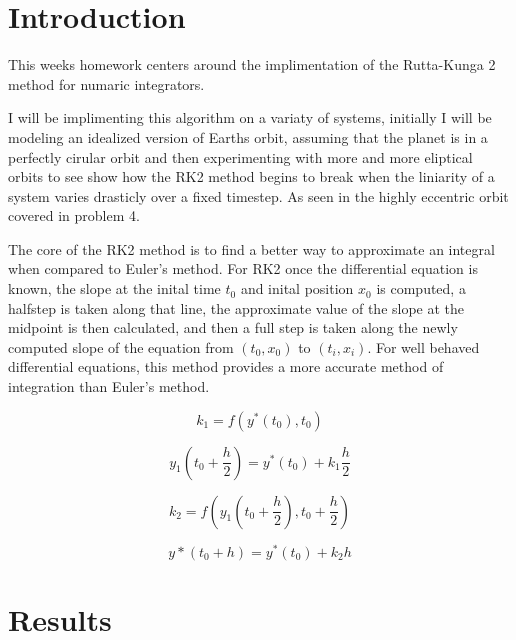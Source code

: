 \documentclass{article}
\author{\hwauthor}
\title{\hwtitle}
\date{\hwdate}
\begin{document}
\maketitle
\thispagestyle{fancy}

\section{Introduction}
 
This weeks homework centers around the implimentation of the Rutta-Kunga 2 method for numaric integrators.

I will be implimenting this algorithm on a variaty of systems, initially I will be modeling an idealized version of Earths orbit, assuming that the planet is in a perfectly cirular orbit and then experimenting with more and more eliptical orbits to see show how the RK2 method begins to break when the liniarity of a system varies drasticly over a fixed timestep. As seen in the highly eccentric orbit covered in problem 4. 

The core of the RK2 method is to find a better way to approximate an integral when compared to Euler's method. For RK2 once the differential equation is known, the slope at the inital time $t_0$ and inital position $x_0$ is computed, a halfstep is taken along that line, the approximate value of the slope at the midpoint is then calculated, and then a full step is taken along the newly computed slope of the equation from $(t_0, x_0)$ to $(t_i, x_i)$. For well behaved differential equations, this method provides a more accurate method of integration than Euler's method.

\begin{equation}
	k_1 = f(y^*(t_0),t_0)
\end{equation}

\begin{equation}
	y_1(t_0 + \frac{h}{2}) = y^*(t_0) + k_1\frac{h}{2}
\end{equation}

\begin{equation}
	k_2 = f(y_1(t_0+\frac{h}{2}), t_0 +\frac{h}{2})
\end{equation}

\begin{equation}\label{eq:rk2}
	y*(t_0+h) = y^*(t_0)+k_2h
\end{equation}

\section{Results}
\end{document}
